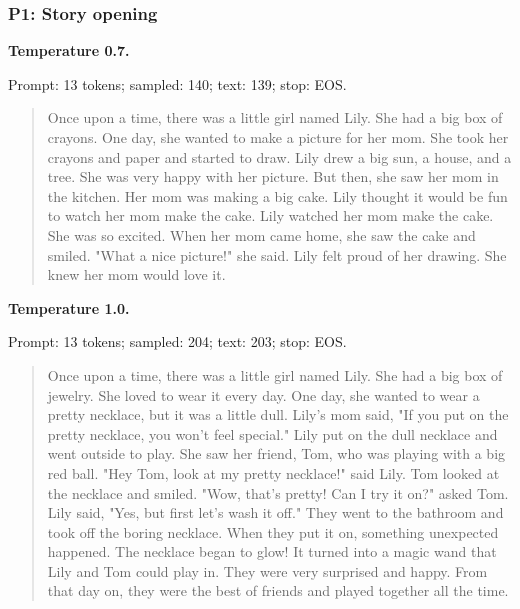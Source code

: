 \subsubsection{P1: Story opening}


\textbf{Temperature 0.7.}

{\footnotesize Prompt: 13 tokens; sampled: 140; text: 139; stop: EOS.}

\begin{quote}\small

Once upon a time, there was a little girl named Lily. She had a big box of crayons. One day, she wanted to make a picture for her mom. She took her crayons and paper and started to draw.
Lily drew a big sun, a house, and a tree. She was very happy with her picture. But then, she saw her mom in the kitchen. Her mom was making a big cake. Lily thought it would be fun to watch her mom make the cake.
Lily watched her mom make the cake. She was so excited. When her mom came home, she saw the cake and smiled. "What a nice picture!" she said. Lily felt proud of her drawing. She knew her mom would love it.

\end{quote}


\textbf{Temperature 1.0.}

{\footnotesize Prompt: 13 tokens; sampled: 204; text: 203; stop: EOS.}

\begin{quote}\small

Once upon a time, there was a little girl named Lily. She had a big box of jewelry. She loved to wear it every day. One day, she wanted to wear a pretty necklace, but it was a little dull. Lily's mom said, "If you put on the pretty necklace, you won't feel special."
Lily put on the dull necklace and went outside to play. She saw her friend, Tom, who was playing with a big red ball. "Hey Tom, look at my pretty necklace!" said Lily. Tom looked at the necklace and smiled. "Wow, that's pretty! Can I try it on?" asked Tom.
Lily said, "Yes, but first let's wash it off." They went to the bathroom and took off the boring necklace. When they put it on, something unexpected happened. The necklace began to glow! It turned into a magic wand that Lily and Tom could play in. They were very surprised and happy. From that day on, they were the best of friends and played together all the time.

\end{quote}

